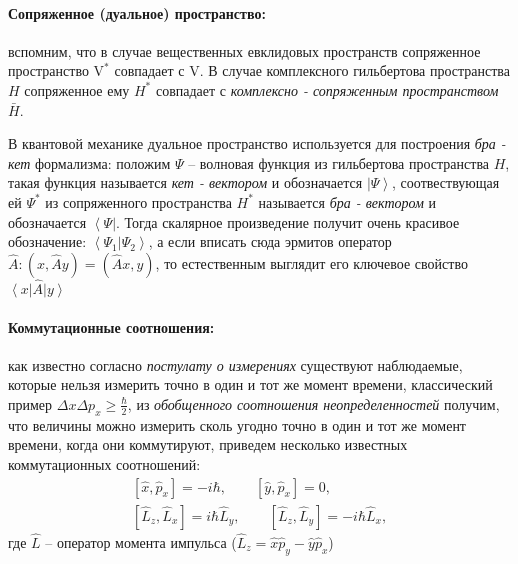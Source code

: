 \documentclass[__minimum__.tex]{subfiles}
\begin{document}
\paragraph{Сопряженное (дуальное) пространство:} вспомним, что в случае вещественных евклидовых пространств сопряженное пространство $\mathrm{V}^{*}$ совпадает с $\mathrm{V}$. В случае комплексного гильбертова пространства $H$ сопряженное ему $H^{*}$ совпадает с \emph{комплексно - сопряженным пространством $\bar{H}$}.

В квантовой механике дуальное пространство используется для построения \emph{бра - кет} формализма: положим $\Psi$ -- волновая функция из гильбертова пространства $H$, такая функция называется \emph{кет - вектором} и обозначается $\left|\Psi\right>$, соотвествующая ей $\Psi^{*}$ из сопряженного пространства $H^{*}$ называется \emph{бра - вектором} и обозначается $\left<\Psi\right|$. Тогда скалярное произведение получит очень красивое обозначение: $\left.\left<\Psi_1\right|\Psi_2\right>$, а если вписать сюда эрмитов оператор $\hat{A}\colon(x,\hat{A}y)=(\hat{A}x,y)$, то естественным выглядит его ключевое свойство $\left<x\right|\hat{A}\left|y\right>$

\paragraph{Коммутационные соотношения:} как известно согласно \emph{постулату о измерениях} существуют наблюдаемые, которые нельзя измерить точно в один и тот же момент времени, классический пример $\Delta{x}\Delta{p_x}\ge\frac{\hbar}{2}$, из \emph{обобщенного соотношения неопределенностей} получим, что величины можно измерить сколь угодно точно в один и тот же момент времени, когда они коммутируют, приведем несколько известных коммутационных соотношений:
\begin{gather}
  \left[\hat{x},\hat{p}_x\right]=-i\hbar,
  \qquad
  \left[\hat{y},\hat{p}_x\right]=0,
  \\
  \left[\hat{L}_z,\hat{L}_x\right]=i\hbar\hat{L}_y,
  \qquad
  \left[\hat{L}_z,\hat{L}_y\right]=-i\hbar\hat{L}_x,
\end{gather}
где $\hat{L}$ -- оператор момента импульса ($\hat{L}_z=\hat{x}\hat{p}_y-\hat{y}\hat{p}_x$)
\end{document}
